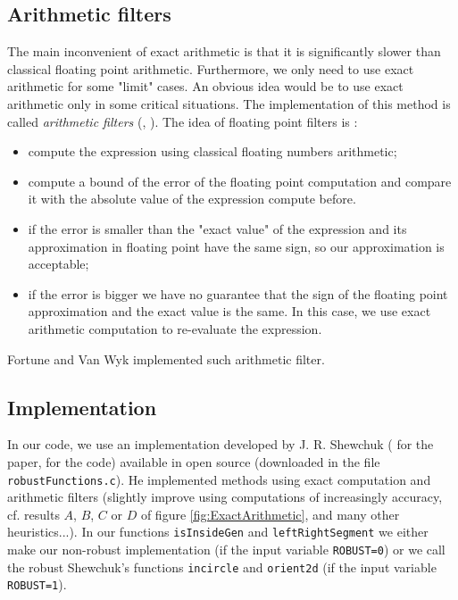 \subsection{Arithmetic filters}
The main inconvenient of exact arithmetic is that it is significantly slower than classical floating point arithmetic. Furthermore, we only need to use exact arithmetic for some "limit" cases. An obvious idea would be to use exact arithmetic only in some critical situations. The implementation of this method is called \textit{arithmetic filters} (\cite{schirra}, \cite{shewchuk1996robust}). The idea of floating point filters is : 
\begin{itemize}
\item compute the expression using classical floating numbers arithmetic;
\item compute a bound of the error of the floating point computation and compare it with the absolute value of the expression compute before.
\item if the error is smaller than the "exact value" of the expression and its approximation in floating point have the same sign, so our approximation is acceptable;
\item if the error is bigger we have no guarantee that the sign of the floating point approximation and the exact value is the same. In this case, we use exact arithmetic computation to re-evaluate the expression.
\end{itemize}

Fortune and Van Wyk implemented such arithmetic filter.

\subsection{Implementation}
In our code, we use an implementation developed by J. R. Shewchuk (\cite{shewchuk1996robust} for the paper, \cite{robust} for the code) available in open source (downloaded in the file \texttt{robustFunctions.c}). He implemented methods using exact computation and arithmetic filters (slightly improve using computations of increasingly accuracy, cf. results $A$, $B$, $C$ or $D$ of figure \ref{fig:ExactArithmetic}, and many other heuristics...). In our functions \texttt{isInsideGen} and \texttt{leftRightSegment} we either make our non-robust implementation (if the input variable \texttt{ROBUST=0}) or we call the robust Shewchuk's functions \texttt{incircle} and \texttt{orient2d} (if the input variable \texttt{ROBUST=1}).








